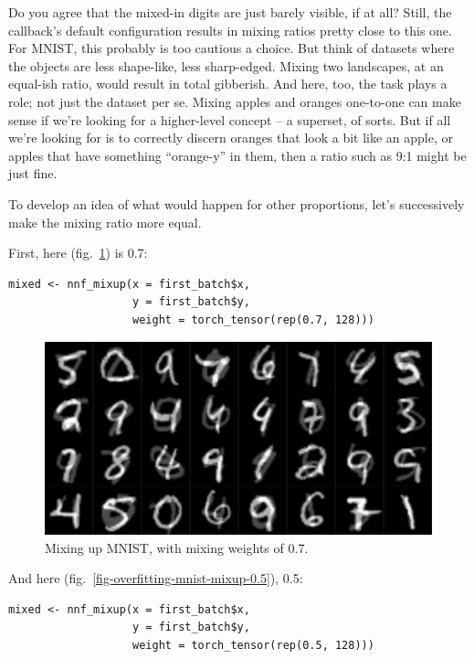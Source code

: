 \documentclass[
  letterpaper,
]{krantz}
\begin{document}
Do you agree that the mixed-in digits are just barely visible, if at
all? Still, the callback's default configuration results in mixing
ratios pretty close to this one. For MNIST, this probably is too
cautious a choice. But think of datasets where the objects are less
shape-like, less sharp-edged. Mixing two landscapes, at an equal-ish
ratio, would result in total gibberish. And here, too, the task plays a
role; not just the dataset per se. Mixing apples and oranges one-to-one
can make sense if we're looking for a higher-level concept -- a
superset, of sorts. But if all we're looking for is to correctly discern
oranges that look a bit like an apple, or apples that have something
``orange-y'' in them, then a ratio such as 9:1 might be just fine.

To develop an idea of what would happen for other proportions, let's
successively make the mixing ratio more equal.

First, here (fig.~\ref{fig-overfitting-mnist-mixup-0.7}) is 0.7:

\begin{verbatim}
mixed <- nnf_mixup(x = first_batch$x,
                   y = first_batch$y,
                   weight = torch_tensor(rep(0.7, 128)))
\end{verbatim}

\begin{figure}[H]

{\centering \includegraphics{images/overfitting-mnist-mixup-0.7.png}

}

\caption{\label{fig-overfitting-mnist-mixup-0.7}Mixing up MNIST, with
mixing weights of 0.7.}

\end{figure}

And here (fig.~\ref{fig-overfitting-mnist-mixup-0.5}), 0.5:

\begin{verbatim}
mixed <- nnf_mixup(x = first_batch$x,
                   y = first_batch$y,
                   weight = torch_tensor(rep(0.5, 128)))
\end{verbatim}
\end{document}
